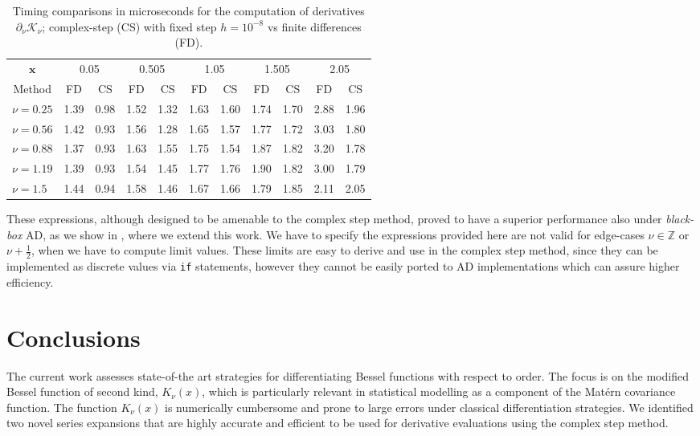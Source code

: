 \documentclass{article}
\begin{document}
\begin{table}[ht!]
    \centering
  \vspace{-0.5em}    
\begin{tabular}{|l|c|c|c|c|c|c|c|c|c|c|}
\hline
\multicolumn{1}{|c|}{$\bm{x}$} & \multicolumn{2}{c|}{0.05} & \multicolumn{2}{c|}{0.505}& \multicolumn{2}{c|}{1.05} & \multicolumn{2}{c|}{1.505}& \multicolumn{2}{c|}{2.05}\\
\cline{2-11}
\multicolumn{1}{|c|}{Method} & FD & CS & FD & CS & FD & CS & FD & CS & FD & CS \\
\hline
$\nu=0.25$&1.39 & 0.98&   1.52 &   1.32  &  1.63 &   1.60  & 1.74 &  1.70 &2.88  &   1.96 \\
$\nu=0.56$ &1.42 & 0.93 &  1.56 &  1.28 &  1.65 &  1.57 &  1.77 &   1.72  & 3.03 &  1.80 \\
$\nu=0.88$    &   1.37 &  0.93&  1.63 &  1.55 &  1.75 &   1.54 &   1.87 &  1.82  &  3.20 &   1.78 \\
$\nu=1.19$&    1.39 &  0.93&   1.54  &  1.45 &    1.77 &   1.76  &   1.90  & 1.82 &   3.00 &  1.79 \\
$\nu= 1.5$&    1.44 &   0.94&   1.58 &  1.46 &   1.67 &   1.66 &  1.79 &  1.85 &  2.11   &   2.05\\
\hline
\end{tabular} 
     \vspace{0.8em}
    \caption{Timing comparisons in microseconds for the computation of derivatives $\partial_{\nu} \mathcal{K}_{\nu}$; complex-step (CS) with fixed step $h=10^{-8}$ vs finite differences (FD).}
    \label{tab:timings}
      \vspace{-2em}
\end{table}

These expressions, although designed to be amenable to the complex step method, proved to have a superior performance also under \emph{black-box} AD, as we show in \cite{geogaAD2021}, where we extend this work. We have to specify the expressions provided here are not valid for edge-cases $\nu\in\mathbb Z$ or $\nu+\tfrac{1}{2}$, when we have to compute limit values. These limits are easy to derive and use in the complex step method, since they can be implemented as discrete values via \texttt{if} statements, however they cannot be easily ported to AD implementations which can assure higher efficiency. 

\section{Conclusions}\label{sec:conclusions}
The current work assesses state-of-the art strategies for differentiating Bessel functions with respect to order. The focus is on the modified Bessel function of second kind, $K_{\nu}(x)$, which is particularly relevant in statistical modelling as a component of the Mat\'ern covariance function. The function $K_{\nu}(x)$ is numerically cumbersome and prone to large errors under classical differentiation strategies. We identified two novel series expansions that are highly accurate and efficient to be used for derivative evaluations using the complex step method. 
\end{document}

